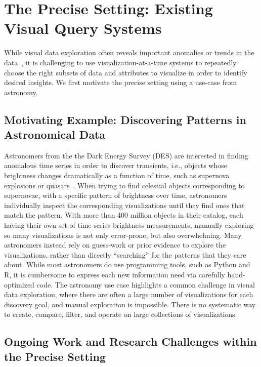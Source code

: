 
\section{The Precise Setting: Existing Visual Query Systems}\label{sec:precise}
While visual data exploration often reveals 
important anomalies or trends 
in the data~\cite{Heer2012,Morton2014}, 
it is challenging to 
use visualization-at-a-time systems to 
repeatedly choose the right subsets of 
data and attributes to visualize
in order to identify desired insights.
We first motivate
the precise setting using a use-case from
astronomy.

\subsection{Motivating Example: Discovering Patterns in Astronomical Data}
Astronomers from the the Dark Energy Survey (DES) 
are interested in finding 
anomalous time series 
in order to discover 
transients, 
i.e., objects whose brightness 
changes dramatically as a function of time, 
such as supernova explosions or quasars~\cite{Drlica-Wagner2017}. 
When trying to find celestial objects 
corresponding to supernovae, 
with a specific pattern of brightness over time, 
astronomers individually inspect the corresponding 
visualizations until 
they find ones that match the pattern. 
With more than 400 million objects in their catalog, 
each having their own set of time series brightness measurements, 
manually exploring so many 
visualizations is not only error-prone, 
but also overwhelming.
Many astronomers instead rely on guess-work 
or prior evidence to explore the visualizations,
rather than directly ``searching'' for the patterns
that they care about. 
While most astronomers do use 
programming tools, such as Python and R,
it is cumbersome to express each new information need
via carefully hand-optimized code. 
The astronomy use case highlights a 
common challenge in visual data exploration,
where there are often a large number of visualizations
for each discovery goal,
and manual exploration is impossible.
There is no systematic way to create, compare, filter,
and operate on large collections of visualizations.

\subsection{Ongoing Work and Research Challenges within the Precise Setting}

